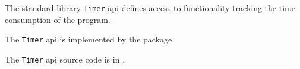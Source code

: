 
The standard library {\tt Timer} api defines access to functionality tracking 
the time consumption of the program.

The {\tt Timer} api is implemented by the  package.

The {\tt Timer} api source code is in .

